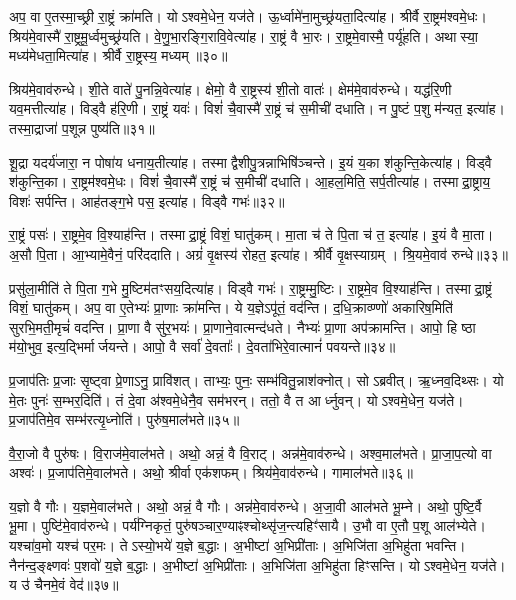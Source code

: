 अप॒ वा ए॒तस्मा॒च्छ्री रा॒ष्ट्रं क्रा॑मति।
योऽश्वमे॒धेन॒ यज॑ते।
ऊ॒र्ध्वामे॑ना॒मुच्छ्र॑यता॒दित्या॑ह।
श्रीर्वै रा॒ष्ट्रम॑श्वमे॒धः।
श्रिय॑मे॒वास्मै॑ रा॒ष्ट्रमू॒र्ध्वमुच्छ्र॑यति।
वे॒णु॒भा॒रङ्गि॒रावि॒वेत्या॑ह।
रा॒ष्ट्रं वै भा॒रः।
रा॒ष्ट्रमे॒वास्मै॒ पर्यू॑हति।
अथास्या॒ मध्य॑मेधता॒मित्या॑ह।
श्रीर्वै रा॒ष्ट्रस्य॒ मध्यम्॥३०॥

श्रिय॑मे॒वाव॑रुन्धे।
शी॒ते वाते॑ पु॒नन्नि॒वेत्या॑ह।
क्षेमो॒ वै रा॒ष्ट्रस्य॑ शी॒तो वातः॑।
क्षेम॑मे॒वाव॑रुन्धे।
यद्ध॑रि॒णी यव॒मत्तीत्या॑ह।
विड्वै ह॑रि॒णी।
रा॒ष्ट्रं यवः॑।
विशं॑ चै॒वास्मै॑ रा॒ष्ट्रं च॑ स॒मीची॑ दधाति।
न पु॒ष्टं प॒शु म॑न्यत॒ इत्या॑ह।
तस्मा॒द्राजा॑ प॒शून्न पुष्य॑ति॥३१॥

शू॒द्रा यदर्य॑जारा॒ न पोषा॑य धनाय॒तीत्या॑ह।
तस्माद्वैशीपु॒त्रन्नाभिषि॑ञ्चन्ते।
इ॒यं य॒का श॑कुन्ति॒केत्या॑ह।
विड्वै श॑कुन्ति॒का।
रा॒ष्ट्रम॑श्वमे॒धः।
विशं॑ चै॒वास्मै॑ रा॒ष्ट्रं च॑ स॒मीची॑ दधाति।
आ॒हल॒मिति॒ सर्प॒तीत्या॑ह।
तस्माद्रा॒ष्ट्राय॒ विशः॑ सर्पन्ति।
आह॑तङ्ग॒भे पस॒ इत्या॑ह।
विड्वै गभः॑॥३२॥

रा॒ष्ट्रं पसः॑।
रा॒ष्ट्रमे॒व वि॒श्याह॑न्ति।
तस्माद्रा॒ष्ट्रं विशं॒ घातु॑कम्।
मा॒ता च॑ ते पि॒ता च॑ त॒ इत्या॑ह।
इ॒यं वै मा॒ता।
अ॒सौ पि॒ता।
आ॒भ्यामे॒वैनं॒ परि॑ददाति।
अग्रं॑ वृ॒क्षस्य॑ रोहत॒ इत्या॑ह।
श्रीर्वै वृ॒क्षस्याग्रम्।
श्रि॒यमे॒वाव॑ रुन्धे॥३३॥

प्रसु॑ला॒मीति॑ ते पि॒ता ग॒भे मु॒ष्टिम॑तꣳसय॒दित्या॑ह।
विड्वै गभः॑।
रा॒ष्ट्रम्मु॒ष्टिः।
रा॒ष्ट्रमे॒व वि॒श्याह॑न्ति।
तस्माद्रा॒ष्ट्रं विशं॒ घातु॑कम्।
अप॒ वा ए॒तेभ्यः॑ प्रा॒णाः क्रा॑मन्ति।
ये य॒ज्ञे\-ऽपू॑तं॒ वद॑न्ति।
द॒धि॒क्राव्ण्णो॑ अकारिष॒मिति॑ सुरभि॒मती॒मृचं॑ वदन्ति।
प्रा॒णा वै सु॑र॒भयः॑।
प्रा॒णाने॒वात्मन्द॑धते।
नैभ्यः॑ प्रा॒णा अप॑क्रामन्ति।
आपो॒ हि ष्ठा म॑यो॒भुव॒ इत्य॒द्भिर्मार्जयन्ते।
आपो॒ वै सर्वा॑ दे॒वताः᳚।
दे॒वता॑भिरे॒वात्मानं॑ पवयन्ते॥३४॥\anuvakamend[रा॒ष्ट्रस्य॒ मध्यं॒ पुष्य॑ति॒ गभो॑ रुन्धे दधते च॒त्वारि॑ च]

प्र॒जाप॑तिः प्र॒जाः सृ॒ष्ट्वा प्रे॒णाऽनु॒ प्रावि॑शत्।
ताभ्यः॒ पुनः॒ सम्भ॑वितु॒न्नाश॑क्नोत्।
सोऽब्रवीत्।
ऋ॒ध्नव॒दिथ्सः।
यो मे॒तः पुनः॑ स॒म्भर॒दिति॑।
तं दे॒वा अ॑श्वमे॒धेनै॒व सम॑भरन्।
ततो॒ वै त आर्ध्नुवन्।
योऽश्वमे॒धेन॒ यज॑ते।
प्र॒जाप॑तिमे॒व सम्भ॑रत्यृ॒ध्नोति॑।
पुरु॑ष॒माल॑भते॥३५॥

वै॒रा॒जो वै पुरु॑षः।
वि॒राज॑मे॒वाल॑भते।
अथो॒ अन्नं॒ वै वि॒राट्।
अन्न॑मे॒वाव॑रुन्धे।
अश्व॒माल॑भते।
प्रा॒जा॒प॒त्यो वा अश्वः॑।
प्र॒जाप॑तिमे॒वाल॑भते।
अथो॒ श्रीर्वा एक॑शफम्।
श्रिय॑मे॒वाव॑रुन्धे।
गामाल॑भते॥३६॥

य॒ज्ञो वै गौः।
य॒ज्ञमे॒वाल॑भते।
अथो॒ अन्नं॒ वै गौः।
अन्न॑मे॒वाव॑रुन्धे।
अ॒जा॒वी आल॑भते भू॒म्ने।
अथो॒ पुष्टि॒र्वै भू॒मा।
पुष्टि॑मे॒वाव॑रुन्धे।
पर्य॑ग्निकृतं॒ पुरु॑षञ्चार॒ण्याꣴश्चोथ्सृ॑ज॒न्त्यहिꣳ॑सायै।
उ॒भौ वा ए॒तौ प॒शू आल॑भ्येते।
यश्चा॑व॒मो यश्च॑ पर॒मः।
तेऽस्यो॒भये॑ य॒ज्ञे ब॒द्धाः।
अ॒भीष्टा॑ अ॒भिप्री॑ताः।
अ॒भिजि॑ता अ॒भिहु॑ता भवन्ति।
नैन॑न्द॒ङ्क्ष्णवः॑ प॒शवो॑ य॒ज्ञे ब॒द्धाः।
अ॒भीष्टा॑ अ॒भिप्री॑ताः।
अ॒भिजि॑ता अ॒भिहु॑ता हिꣳसन्ति।
योऽश्वमे॒धेन॒ यज॑ते।
य उ॑ चैनमे॒वं वेद॑॥३७॥\anuvakamend[ल॒भ॒ते॒ गामाल॑भते पर॒मो\-ऽष्टौ च॑]

